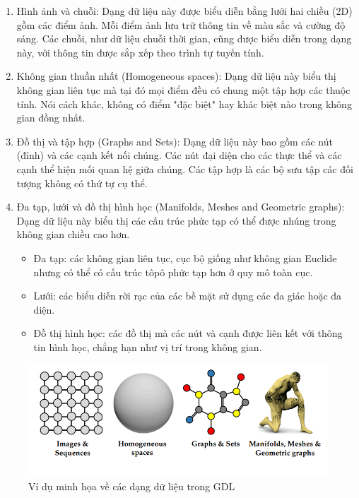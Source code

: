 \begin{enumerate}
    \item Hình ảnh và chuỗi: Dạng dữ liệu này được biểu diễn bằng lưới hai chiều (2D) gồm các điểm ảnh. Mỗi điểm ảnh lưu trữ thông tin về màu sắc và cường độ sáng. Các chuỗi, như dữ liệu chuỗi thời gian, cũng được biểu diễn trong dạng này, với thông tin được sắp xếp theo trình tự tuyến tính.

    \item Không gian thuần nhất (Homogeneous spaces): Dạng dữ liệu này biểu thị không gian liên tục mà tại đó mọi điểm đều có chung một tập hợp các thuộc tính. Nói cách khác, không có điểm "đặc biệt" hay khác biệt nào trong không gian đồng nhất.


    \item Đồ thị và tập hợp (Graphs and Sets): Dạng dữ liệu này bao gồm các nút (đỉnh) và các cạnh kết nối chúng. Các nút đại diện cho các thực thể và các cạnh thể hiện mối quan hệ giữa chúng. Các tập hợp là các bộ sưu tập các đối tượng không có thứ tự cụ thể.


    \item Đa tạp, lưới và đồ thị hình học (Manifolds, Meshes and Geometric graphs): Dạng dữ liệu này biểu thị các cấu trúc phức tạp có thể được nhúng trong không gian chiều cao hơn.
    \begin{itemize}
        \item Đa tạp: các không gian liên tục, cục bộ giống như không gian Euclide nhưng có thể có cấu trúc tôpô phức tạp hơn ở quy mô toàn cục.

        \item Lưới: các biểu diễn rời rạc của các bề mặt sử dụng các đa giác hoặc đa diện.
        
        \item Đồ thị hình học: các đồ thị mà các nút và cạnh được liên kết với thông tin hình học, chẳng hạn như vị trí trong không gian.
\end{itemize}
\end{enumerate}
\begin{figure}[H]
    \centering
    \includegraphics[width=0.7\linewidth]{Images/GDL/gdl_data.png}
    \caption{Ví dụ minh họa về các dạng dữ liệu trong GDL\cite{geometricdeep2022}}
\end{figure}

